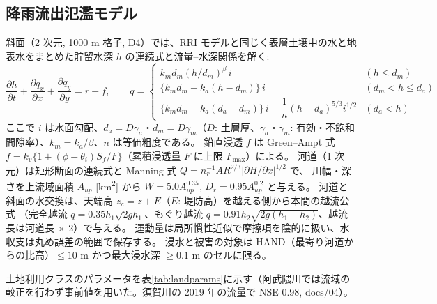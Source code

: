 \documentclass[a4paper,10pt]{ltjsarticle}
\begin{document}
\subsection{降雨流出氾濫モデル}
斜面（2 次元, 1000 m 格子, D4）では、RRI モデル\cite{sayama2012}と同じく表層土壌中の水と地表水をまとめた貯留水深 $h$ の連続式と流量–水深関係を解く:
\begin{equation}
\frac{\partial h}{\partial t}+\frac{\partial q_x}{\partial x}+\frac{\partial q_y}{\partial y}=r-f,\qquad
q=\begin{cases}
k_m d_m (h/d_m)^{\beta}\, i & (h\le d_m)\\
\{k_m d_m + k_a(h-d_m)\}\, i & (d_m<h\le d_a)\\
\{k_m d_m + k_a(d_a-d_m)\}\, i + \dfrac{1}{n}(h-d_a)^{5/3} i^{1/2} & (d_a<h)
\end{cases}
\label{eq:slope}
\end{equation}
ここで $i$ は水面勾配、$d_a=D\gamma_a$・$d_m=D\gamma_m$（$D$: 土層厚、$\gamma_a$・$\gamma_m$: 有効・不飽和間隙率）、$k_m=k_a/\beta$、$n$ は等価粗度である。
鉛直浸透 $f$ は Green–Ampt 式\cite{greenampt1911} $f=k_v\{1+(\phi-\theta_i)S_f/F\}$（累積浸透量 $F$ に上限 $F_{\max}$）による。
河道（1 次元）は矩形断面の連続式と Manning 式 $Q=n_r^{-1}AR^{2/3}|\partial H/\partial x|^{1/2}$ で、
川幅・深さを上流域面積 $A_{up}$ [km\textsuperscript{2}] から $W=5.0A_{up}^{0.35}$, $D_r=0.95A_{up}^{0.2}$ と与える。
河道と斜面の水交換は、天端高 $z_c=z+E$（$E$: 堤防高）を越える側から本間の越流公式\cite{honma1940}
（完全越流 $q=0.35h_1\sqrt{2gh_1}$、もぐり越流 $q=0.91h_2\sqrt{2g(h_1-h_2)}$、越流長は河道長 × 2）で与える。
運動量は局所慣性近似\cite{bates2010}で摩擦項を陰的に扱い、水収支は丸め誤差の範囲で保存する。
浸水と被害の対象は HAND\cite{renno2008,nobre2011}（最寄り河道からの比高）$\le 10$ m かつ最大浸水深 $\ge 0.1$ m のセルに限る。

土地利用クラスのパラメータを表\ref{tab:landparams}に示す（阿武隈川では流域の較正を行わず事前値を用いた。須賀川の 2019 年の流量で NSE 0.98, docs/04）。
\end{document}
